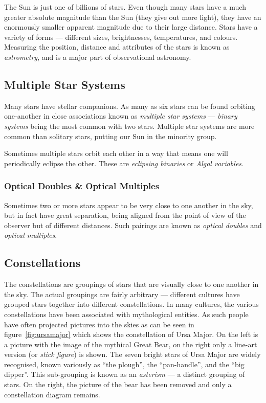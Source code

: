 The Sun is just one of billions of stars. Even though many stars have a
much greater absolute magnitude than the Sun (they give out more light),
they have an enormously smaller apparent magnitude due to their large
distance. Stars have a variety of forms --- different sizes,
brightnesses, temperatures, and colours. Measuring the position,
distance and attributes of the stars is known as \emph{astrometry}, and
is a major part of observational astronomy.

\subsection{Multiple Star Systems}
\label{sec:Phenomena:multipleStars}

Many stars have stellar companions. As many as six stars can be found
orbiting one-another in close associations known as
\emph{multiple star systems} --- \emph{binary systems} being the most
common with two stars. Multiple star systems are more common than
solitary stars, putting our Sun in the minority group.

Sometimes multiple stars orbit each other in a way that means one will
periodically eclipse the other. These are \emph{eclipsing binaries} or
\emph{Algol variables}.

\subsubsection{Optical Doubles \& Optical Multiples}
\label{sec:Phenomena:multipleStars:optical}

Sometimes two or more stars appear to be very close to one another in
the sky, but in fact have great separation, being aligned from the point
of view of the observer but of different distances. Such pairings are
known as \emph{optical doubles} and \emph{optical multiples}.

\subsection{Constellations}
\label{sec:Phenomena:Constellations}

The constellations are groupings of stars that are visually close to one
another in the sky. The actual groupings are fairly arbitrary ---
different cultures have grouped stars together into different
constellations. In many cultures, the various constellations have been
associated with mythological entities. As such people have often
projected pictures into the skies as can be seen in figure~\ref{fig:ursamajor} which shows the constellation of Ursa Major. On the
left is a picture with the image of the mythical Great Bear, on the
right only a line-art version (or \emph{stick figure}) is shown. The seven bright stars of Ursa
Major are widely recognised, known variously as ``the plough'', the
``pan-handle'', and the ``big dipper''. This sub-grouping is known as an
\emph{asterism} --- a distinct grouping of stars. On the right, the
picture of the bear has been removed and only a constellation diagram
remains.

